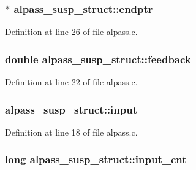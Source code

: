 \subsubsection[{\texorpdfstring{endptr}{endptr}}]{$\ast$ alpass\+\_\+susp\+\_\+struct\+::endptr}\hypertarget{structalpass__susp__struct_a9c4a8987b95eae754cb3726cce88c1bf}{}\label{structalpass__susp__struct_a9c4a8987b95eae754cb3726cce88c1bf}


Definition at line 26 of file alpass.\+c.

\subsubsection[{\texorpdfstring{feedback}{feedback}}]{\setlength{\rightskip}{0pt plus 5cm}double alpass\+\_\+susp\+\_\+struct\+::feedback}\hypertarget{structalpass__susp__struct_aaafec462fbd800fd415e4322973dc351}{}\label{structalpass__susp__struct_aaafec462fbd800fd415e4322973dc351}


Definition at line 22 of file alpass.\+c.

\subsubsection[{\texorpdfstring{input}{input}}]{ alpass\+\_\+susp\+\_\+struct\+::input}\hypertarget{structalpass__susp__struct_a3913fd64f64ed2ce47341733af0fc982}{}\label{structalpass__susp__struct_a3913fd64f64ed2ce47341733af0fc982}


Definition at line 18 of file alpass.\+c.

\subsubsection[{\texorpdfstring{input\+\_\+cnt}{input_cnt}}]{\setlength{\rightskip}{0pt plus 5cm}long alpass\+\_\+susp\+\_\+struct\+::input\+\_\+cnt}\hypertarget{structalpass__susp__struct_a4d723d11e173b6a0afcead1d3389f87c}{}\label{structalpass__susp__struct_a4d723d11e173b6a0afcead1d3389f87c}


